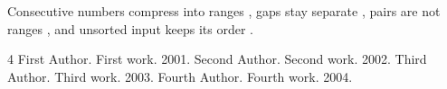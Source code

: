 \documentclass{article}
\begin{document}
Consecutive numbers compress into ranges \cite{a,b,c}, gaps stay separate
\cite{a,c,d}, pairs are not ranges \cite{a,b}, and unsorted input keeps its
order \cite{d,c,b,a}.

\begin{thebibliography}{4}
 First Author. First work. 2001.
 Second Author. Second work. 2002.
 Third Author. Third work. 2003.
 Fourth Author. Fourth work. 2004.
\end{thebibliography}
\end{document}
